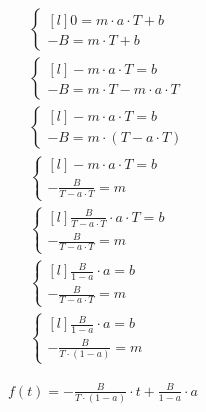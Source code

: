 \begin{task}
\begin{align*}
&\left\{\begin{matrix*}[l]
0 = m\cdot a \cdot T +b\\ 
-B = m\cdot T +b
\end{matrix*}\right. \\
&\left\{\begin{matrix*}[l]
-m \cdot a \cdot T = b\\ 
-B = m \cdot T -m \cdot a \cdot T
\end{matrix*}\right. \\
&\left\{\begin{matrix*}[l]
-m \cdot a \cdot T = b\\ 
-B = m \cdot \left( T - a \cdot T\right)
\end{matrix*}\right. \\
&\left\{\begin{matrix*}[l]
-m \cdot a \cdot T = b\\ 
-\frac{B}{T - a \cdot T} = m
\end{matrix*}\right. \\
&\left\{\begin{matrix*}[l]
\frac{B}{T - a \cdot T} \cdot a \cdot T = b\\ 
-\frac{B}{T - a \cdot T} = m
\end{matrix*}\right. \\
&\left\{\begin{matrix*}[l]
\frac{B}{1 - a} \cdot a = b\\ 
-\frac{B}{T - a \cdot T} = m
\end{matrix*}\right. \\
&\left\{\begin{matrix*}[l]
\frac{B}{1 - a} \cdot a = b\\ 
-\frac{B}{T \cdot \left( 1 - a \right)} = m
\end{matrix*}\right.
\end{align*}


\begin{align*}
f(t) = -\frac{B}{T \cdot \left(1 - a \right)}\cdot t + \frac{B}{1 - a} \cdot a
\end{align*}



\end{task}
